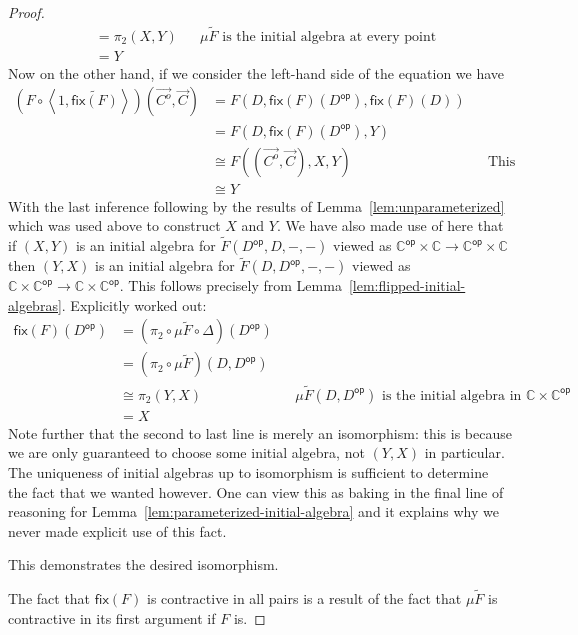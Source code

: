 \documentclass{amsart}
\newcommand{\Ccat}{\ensuremath{\mathbb{C}}}
\newcommand{\op}[1]{\ensuremath{#1^{\mathsf{op}}}}
\newcommand{\symmetrize}[1]{\ensuremath{\widetilde{#1}}}
\newcommand{\pair}[2]{\ensuremath{\left\langle #1, #2 \right\rangle}}
\newcommand{\fix}[1]{\ensuremath{\mathsf{fix}(#1)}}
\newcommand{\arr}[1]{\ensuremath{\overrightarrow{#1}}}
\begin{document}
\begin{proof}
\begin{align*}
    &= \pi_2(X, Y) && \text{$\mu \symmetrize{F}$ is the initial
                      algebra at every point}\\
    &= Y
  \end{align*}
  Now on the other hand, if we consider the left-hand side of the
  equation we have
  \begin{align*}
    (F \circ \pair{1}{\symmetrize{\fix{F}}})(\arr{C^o}, \arr{C})
    &= F(D, \fix{F}(\op{D}), \fix{F}(D))\\
    &= F(D, \fix{F}(\op{D}), Y)\\
    &\cong F((\arr{C^o}, \arr{C}), X, Y)  && \text{This step is justified below.}\\
    &\cong Y
  \end{align*}
  With the last inference following by the results of
  Lemma~\ref{lem:unparameterized} which was used above to construct
  $X$ and $Y$. We have also made use of here that if $(X, Y)$ is an
  initial algebra for $\symmetrize{F}(\op{D}, D, -, -)$ viewed as
  $\op{\Ccat} \times \Ccat \to \op{\Ccat} \times \Ccat$ then $(Y, X)$
  is an initial algebra for $\symmetrize{F}(D, \op{D}, -, -)$ viewed
  as $\Ccat \times \op{\Ccat} \to \Ccat \times \op{\Ccat}$. This
  follows precisely from
  Lemma~\ref{lem:flipped-initial-algebras}. Explicitly worked out:
  \begin{align*}
    \fix{F}(\op{D})
    &= (\pi_2 \circ \mu \symmetrize{F} \circ \Delta)(\op{D})\\
    &= (\pi_2 \circ \mu \symmetrize{F})(D, \op{D})\\
    &\cong \pi_2(Y, X) && \text{$\mu \symmetrize{F}(D, \op{D})$ is the initial
                      algebra in $\Ccat \times \op{\Ccat}$}\\
    &= X
  \end{align*}
  Note further that the second to last line is merely an isomorphism:
  this is because we are only guaranteed to choose some initial
  algebra, not $(Y, X)$ in particular. The uniqueness of initial
  algebras up to isomorphism is sufficient to determine the fact that
  we wanted however. One can view this as baking in the final line of
  reasoning for Lemma~\ref{lem:parameterized-initial-algebra} and it
  explains why we never made explicit use of this fact.

  This demonstrates the desired isomorphism.

  The fact that $\fix{F}$ is contractive in all pairs is a result of
  the fact that $\mu \symmetrize{F}$ is contractive in its first
  argument if $F$ is.
\end{proof}



\end{document}
